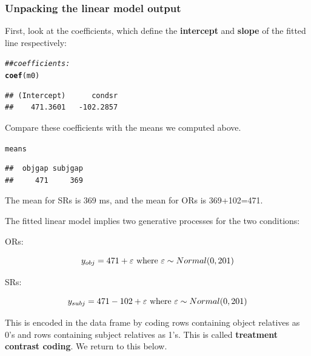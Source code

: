 \documentclass[12pt]{book}\usepackage[]{graphicx}\usepackage[]{color}
\makeatletter
\newcommand{\hlcom}[1]{\textcolor[rgb]{0.678,0.584,0.686}{\textit{#1}}}%
\newcommand{\hlstd}[1]{\textcolor[rgb]{0.345,0.345,0.345}{#1}}%
\newcommand{\hlkwd}[1]{\textcolor[rgb]{0.737,0.353,0.396}{\textbf{#1}}}%
\newenvironment{kframe}{%
 \def\at@end@of@kframe{}%
 \ifinner\ifhmode%
  \def\at@end@of@kframe{\end{minipage}}%
  \begin{minipage}{\columnwidth}%
 \fi\fi%
 \def\FrameCommand##1{\hskip\@totalleftmargin \hskip-\fboxsep
 \colorbox{shadecolor}{##1}\hskip-\fboxsep
     \hskip-\linewidth \hskip-\@totalleftmargin \hskip\columnwidth}%
 \MakeFramed {\advance\hsize-\width
   \@totalleftmargin\z@ \linewidth\hsize
   \@setminipage}}%
 {\par\unskip\endMakeFramed%
 \at@end@of@kframe}
\newenvironment{knitrout}{}{} %
\makeatother
\begin{document}
\subsubsection{Unpacking the linear model output}

First, look at the coefficients, which define the \textbf{intercept} and \textbf{slope} of the fitted line respectively:

\begin{knitrout}
\color{fgcolor}\begin{kframe}
\begin{alltt}
\hlcom{## coefficients:}
\hlkwd{coef}\hlstd{(m0)}
\end{alltt}
\begin{verbatim}
## (Intercept)      condsr 
##    471.3601   -102.2857
\end{verbatim}
\end{kframe}
\end{knitrout}

Compare these coefficients with the means we computed above.

\begin{knitrout}
\color{fgcolor}\begin{kframe}
\begin{alltt}
\hlstd{means}
\end{alltt}
\begin{verbatim}
##  objgap subjgap 
##     471     369
\end{verbatim}
\end{kframe}
\end{knitrout}

The mean for SRs is 369 ms, and the mean for ORs is 369+102=471.

The fitted linear model implies two generative processes for the two conditions:

ORs:

\begin{equation}
y_{obj} =  471 + \varepsilon \hbox{ where } \varepsilon \sim Normal(0,201)
\end{equation}

SRs:

\begin{equation}
y_{subj} =  471 - 102 +  \varepsilon \hbox{ where } \varepsilon \sim Normal(0,201)
\end{equation}

This is encoded in the data frame by coding rows containing object relatives as 0's and rows containing subject relatives as 1's. This is called \textbf{treatment contrast coding}. We return to this below.
\end{document}
